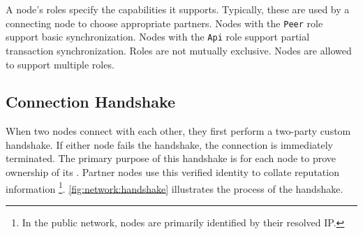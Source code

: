A node's roles specify the capabilities it supports.
Typically, these are used by a connecting node to choose appropriate partners.
Nodes with the \texttt{Peer} role support basic synchronization.
Nodes with the \texttt{Api} role support partial transaction synchronization.
Roles are not mutually exclusive.
Nodes are allowed to support multiple roles.

\subsection{Connection Handshake}

When two \codenamespace nodes connect with each other, they first perform a two-party custom handshake.
If either node fails the handshake, the connection is immediately terminated.
The primary purpose of this handshake is for each node to prove ownership of its .
Partner nodes use this verified identity to collate reputation  information
\footnote{In the public network, nodes are primarily identified by their resolved IP.}.
\autoref{fig:network:handshake} illustrates the process of the handshake.

